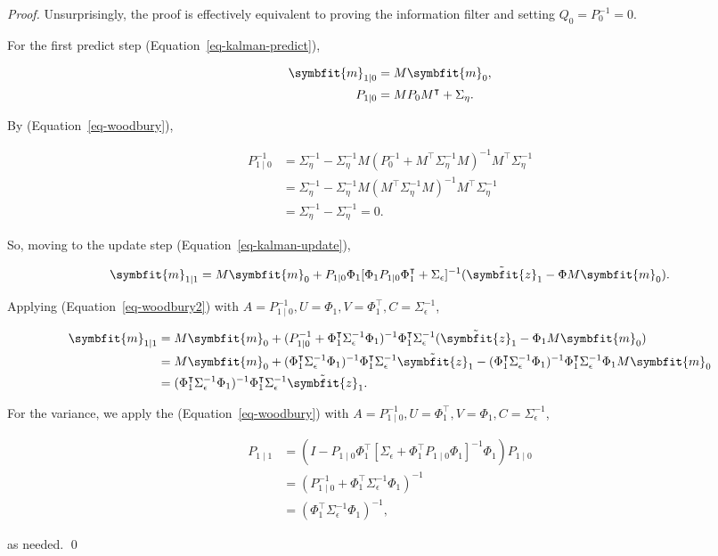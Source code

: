 \documentclass[
]{report}
\newcommand{\bv}[1]{\symbfit{#1}}
\theoremstyle{plain}
\theoremstyle{plain}
\theoremstyle{remark}
\begin{document}
\begin{proof}
Unsurprisingly, the proof is effectively equivalent to proving the
information filter and setting \(Q_0 = P_0^{-1}=0\).

For the first predict step (Equation~\ref{eq-kalman-predict}),

\[\begin{split}
  \bv m_{1\mid0} &= M \bv m_0,\\
  P_{1\mid0} &= M P_0 M^\intercal + \Sigma_\eta.
\end{split}
\]

By (Equation~\ref{eq-woodbury}),

\[\begin{split}
  P_{1\mid0}^{-1} &= \Sigma_\eta^{-1} - \Sigma_\eta^{-1} M (P_0^{-1} + M^\intercal \Sigma_\eta^{-1} M)^{-1}M^\intercal\Sigma_\eta^{-1}\\
  &= \Sigma_\eta^{-1} - \Sigma_\eta^{-1} M (M^\intercal \Sigma_\eta^{-1} M)^{-1}M^\intercal\Sigma_\eta^{-1}\\
  &= \Sigma_\eta^{-1} - \Sigma_\eta^{-1} = 0.
\end{split}
\]

So, moving to the update step (Equation~\ref{eq-kalman-update}),

\[\begin{split}
  \bv m_{1\mid1} = M \bv m_0 + P_{1\mid0}\Phi_1 [\Phi_1 P_{1\mid0} \Phi_1^\intercal + \Sigma_\epsilon]^{-1}(\tilde{\bv{z}}_1 - \Phi M \bv m_0).\\
\end{split}
\]

Applying (Equation~\ref{eq-woodbury2}) with
\(A = P_{1\mid0}^{-1}, U=\Phi_1, V=\Phi_1^\intercal, C=\Sigma_\epsilon^{-1}\),

\[\begin{split}
  \bv m_{1\mid1} &= M \bv m_0 + (P_{1\mid0}^{-1} + \Phi_1^\intercal\Sigma_\epsilon^{-1} \Phi_1)^{-1}\Phi_1^\intercal \Sigma_\epsilon^{-1}(\tilde{\bv{z}}_1 - \Phi_1 M\bv m_0)\\
  &= M \bv m_0 + (\Phi_1^\intercal\Sigma_\epsilon^{-1}\Phi_1)^{-1}\Phi_1^\intercal\Sigma_\epsilon^{-1} \tilde{\bv{z}}_1 - (\Phi_1^\intercal\Sigma_\epsilon^{-1}\Phi_1)^{-1}\Phi_1^\intercal\Sigma_\epsilon^{-1}\Phi_1M\bv m_0\\
  &= (\Phi_1^\intercal\Sigma_\epsilon^{-1}\Phi_1)^{-1}\Phi_1^\intercal\Sigma_\epsilon^{-1} \tilde{\bv{z}}_1.
\end{split}
\]

For the variance, we apply the (Equation~\ref{eq-woodbury}) with
\(A = P_{1\mid0}^{-1}, U=\Phi_1^\intercal, V=\Phi_1, C=\Sigma_\epsilon^{-1}\),

\[\begin{split}
  P_{1\mid1} &= (I - P_{1\mid0}\Phi_1^\intercal[\Sigma_\epsilon + \Phi_1^\intercal P_{1\mid0}\Phi_1]^{-1}\Phi_1)P_{1\mid0}\\
  &= (P_{1\mid0}^{-1} + \Phi_1^\intercal \Sigma_\epsilon^{-1}\Phi_1)^{-1}\\
  &= (\Phi_1^\intercal \Sigma_\epsilon^{-1}\Phi_1)^{-1},
\end{split}
\]

as needed. \qed
\end{proof}
\end{document}
